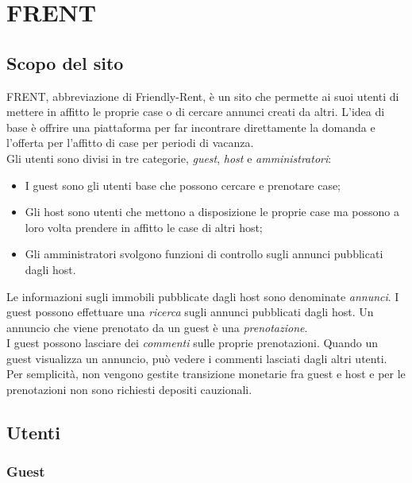\documentclass[1_relazione.tex]{subfiles}
\begin{document}
\section{FRENT}

\subsection{Scopo del sito}
FRENT, abbreviazione di Friendly-Rent, \`{e} un sito che permette ai suoi utenti di mettere in affitto le proprie case o di cercare annunci creati da altri. L'idea di base \`{e} offrire una piattaforma per far incontrare direttamente la domanda e l'offerta per l'affitto di case per periodi di vacanza. \\
Gli utenti sono divisi in tre categorie,  \textit{guest}, \textit{host} e \textit{amministratori}:
\begin{itemize}
 \item I guest sono gli utenti base che possono cercare e prenotare case;
 \item Gli host sono utenti che mettono a disposizione le proprie case ma possono a loro volta prendere in affitto le case di altri host;
 \item Gli amministratori svolgono funzioni di controllo sugli annunci pubblicati dagli host.
\end{itemize}
Le informazioni sugli immobili pubblicate dagli host sono denominate \textit{annunci}. I guest possono effettuare una \textit{ricerca} sugli annunci pubblicati dagli host. Un annuncio che viene prenotato da un guest \`{e} una \textit{prenotazione}. \\
I guest possono lasciare dei \textit{commenti} sulle proprie prenotazioni. Quando un guest visualizza un annuncio, pu\`{o} vedere i commenti lasciati dagli altri utenti. \\
Per semplicit\`{a}, non vengono gestite transizione monetarie fra guest e host e per le prenotazioni non sono richiesti depositi cauzionali.

\subsection{Utenti}

\subsubsection{Guest} 
\end{document}
